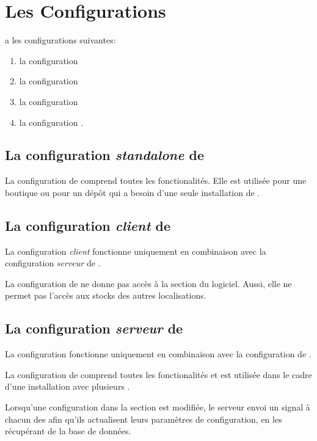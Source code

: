 \chapter{Les Configurations}\label{chap:congigurations-yeren}



\yeroth a les configurations suivantes:
\begin{enumerate}[1)]
	\item la configuration 
	\item la configuration 
	\item la configuration 
	\item la configuration .\\
\end{enumerate}

\section{La configuration \emph{standalone} de \yeroth}
La configuration  de \yeroth comprend
toutes les fonctionalit\'es. Elle est utilis\'ee pour
une boutique ou pour un d\'ep\^ot qui a besoin d'une seule
installation de \yeroth.

\section{La configuration \emph{client} de \yeroth}
La configuration \emph{client} fonctionne uniquement en
combinaison avec la configuration \emph{serveur} de \yeroth.

La configuration  de \yeroth ne donne pas
acc\`es \`a la section  du logiciel.
Aussi, elle ne permet pas l'acc\`es aux stocks des autres
localisations.

\section{La configuration \emph{serveur} de \yeroth}
La configuration  fonctionne uniquement en
combinaison avec la configuration  de \yeroth.

La configuration  de \yeroth comprend
toutes les fonctionalit\'es et est utilis\'ee dans
le cadre d'une installation avec plusieurs .

Lorsqu'une configuration dans la section  est modifi\'ee, le serveur envoi
un signal \`a chacun des  afin qu'ils
actualisent leurs param\`etres de configuration, en
les r\'ecup\'erant de la base de donn\'ees.
